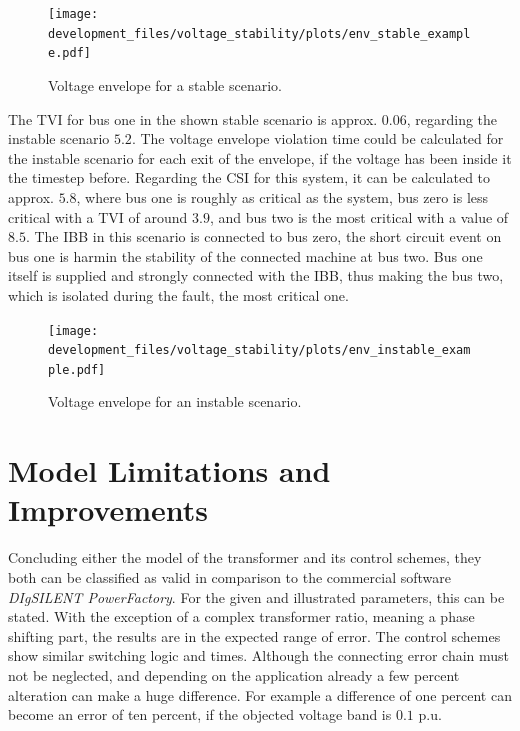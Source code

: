 \begin{figure}[htbp!]
    \centering
    \texttt{[image: development\_files/voltage\_stability/plots/env\_stable\_example.pdf]}
    \caption[Voltage envelope for a stable scenario]{Voltage envelope for a stable scenario.}
    \label{fig:env-stable}
\end{figure}

The \acs{TVI} for bus one in the shown stable scenario is approx. $0.06$, regarding the instable scenario $5.2$.
The voltage envelope violation time could be calculated for the instable scenario for each exit of the envelope, if the voltage has been inside it the timestep before.
Regarding the \acs{CSI} for this system, it can be calculated to approx. $5.8$, where bus one is roughly as critical as the system, bus zero is less critical with a \acs{TVI} of around $3.9$, and bus two is the most critical with a value of $8.5$.
The \acs{IBB} in this scenario is connected to bus zero, the short circuit event on bus one is harmin the stability of the connected machine at bus two. 
Bus one itself is supplied and strongly connected with the \acs{IBB}, thus making the bus two, which is isolated during the fault, the most critical one.

\begin{figure}[htbp!]
    \centering
    \texttt{[image: development\_files/voltage\_stability/plots/env\_instable\_example.pdf]}
    \caption[Voltage envelope for an instable scenario]{Voltage envelope for an instable scenario.}
    \label{fig:env-instable}
\end{figure}

\section{Model Limitations and Improvements}

Concluding either the model of the transformer and its control schemes, they both can be classified as valid in comparison to the commercial software \textit{DIgSILENT PowerFactory}.
For the given and illustrated parameters, this can be stated.
With the exception of a complex transformer ratio, meaning a phase shifting part, the results are in the expected range of error.
The control schemes show similar switching logic and times.
Although the connecting error chain must not be neglected, and depending on the application already a few percent alteration can make a huge difference.
For example a difference of one percent can become an error of ten percent, if the objected voltage band is $0.1$ p.u.

